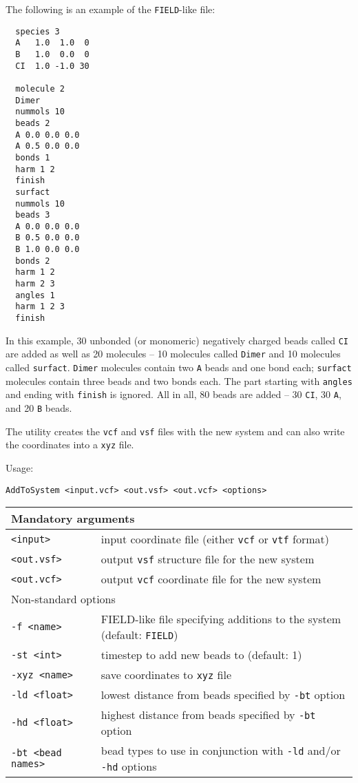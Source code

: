 The following is an example of the \texttt{FIELD}-like file:
\begin{verbatim}
  species 3
  A   1.0  1.0  0
  B   1.0  0.0  0
  CI  1.0 -1.0 30

  molecule 2
  Dimer
  nummols 10
  beads 2
  A 0.0 0.0 0.0
  A 0.5 0.0 0.0
  bonds 1
  harm 1 2
  finish
  surfact
  nummols 10
  beads 3
  A 0.0 0.0 0.0
  B 0.5 0.0 0.0
  B 1.0 0.0 0.0
  bonds 2
  harm 1 2
  harm 2 3
  angles 1
  harm 1 2 3
  finish
\end{verbatim}
In this example, 30 unbonded (or monomeric) negatively charged beads called
\texttt{CI} are added as well as 20 molecules -- 10 molecules called
\texttt{Dimer} and 10 molecules called \texttt{surfact}. \texttt{Dimer}
molecules contain two \texttt{A} beads and one bond each; \texttt{surfact}
molecules contain three beads and two bonds each. The part starting with
\texttt{angles} and ending with \texttt{finish} is ignored. All in all, 80
beads are added -- 30 \texttt{CI}, 30 \texttt{A}, and 20 \texttt{B} beads.

The utility creates the \texttt{vcf} and \texttt{vsf} files with the new
system and can also write the coordinates into a \texttt{xyz} file.

Usage:

\vspace{1em}
\noindent
\texttt{AddToSystem <input.vcf> <out.vsf> <out.vcf> <options>}

\vspace{1em}
\noindent
\begin{longtable}{p{}p{}}
  \toprule
  \multicolumn{2}{l}{Mandatory arguments} \\
  \midrule
  \texttt{<input>} & input coordinate file (either \texttt{vcf} or
    \texttt{vtf} format) \\
  \texttt{<out.vsf>} & output \texttt{vsf} structure file for the new system \\
  \texttt{<out.vcf>} & output \texttt{vcf} coordinate file for the new
  system \\
  \toprule
  \multicolumn{2}{l}{Non-standard options} \\
  \midrule
  \texttt{-f <name>} & FIELD-like file specifying additions to the system
    (default: \texttt{FIELD}) \\
  \texttt{-st <int>} & timestep to add new beads to (default: 1) \\
  \texttt{-xyz <name>} & save coordinates to \texttt{xyz} file \\
  \texttt{-ld <float>} & lowest distance from beads specified by
    \texttt{-bt} option \\
  \texttt{-hd <float>} & highest distance from beads specified by
    \texttt{-bt} option \\
  \texttt{-bt <bead names>} & bead types to use in conjunction with
    \texttt{-ld} and/or \texttt{-hd} options \\
  \bottomrule
\end{longtable}
